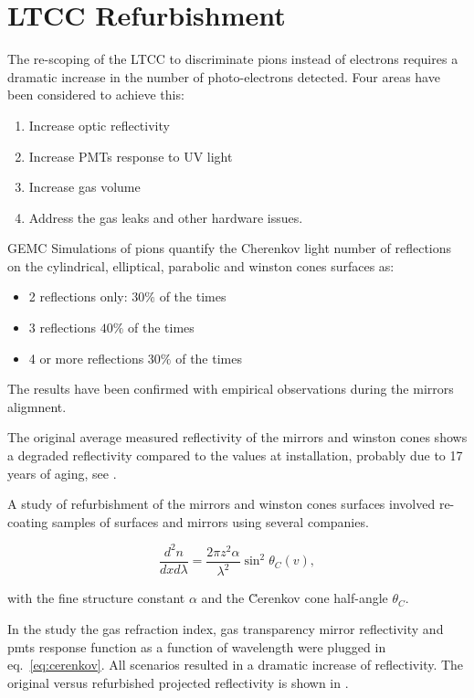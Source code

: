 \section{LTCC Refurbishment}


The re-scoping of the LTCC to discriminate pions instead of electrons requires a dramatic increase in the
number of photo-electrons detected. Four areas have been considered to achieve this:

\begin{enumerate}
	\item Increase optic reflectivity
	\item Increase PMTs response to UV light
	\item Increase gas volume
	\item Address the gas leaks and other hardware issues.
\end{enumerate}


GEMC Simulations of pions quantify the Cherenkov light number of reflections on the cylindrical, elliptical,
parabolic and winston cones surfaces as:

\begin{itemize}
	\item 2 reflections only: $30\%$ of the times
	\item 3 reflections $40\%$ of the times
	\item 4 or more reflections $30\%$ of the times
\end{itemize}

The results have been confirmed with empirical observations during the mirrors aligmnent.

The original average measured reflectivity of the mirrors and winston cones
shows a degraded reflectivity compared to the values at installation, probably due to  17 years of aging, see .

A study of refurbishment of the mirrors and winston cones surfaces
involved re-coating samples of surfaces and mirrors using several companies.

\begin{equation} \label{eq:cerenkov}
	\frac{d^2n}{dxd\lambda} = \frac{2\pi z^2\alpha}{\lambda^2}\sin^2{\theta_C(v)},
\end{equation}

with the fine structure constant $\alpha$ and the \u{C}erenkov cone half-angle
$\theta_C$.

In the study the gas refraction index, gas transparency mirror reflectivity and pmts response function as a function of wavelength
were plugged in eq.~\ref{eq:cerenkov}.
All scenarios resulted in a dramatic increase of reflectivity. The original versus refurbished projected
reflectivity is shown in .

